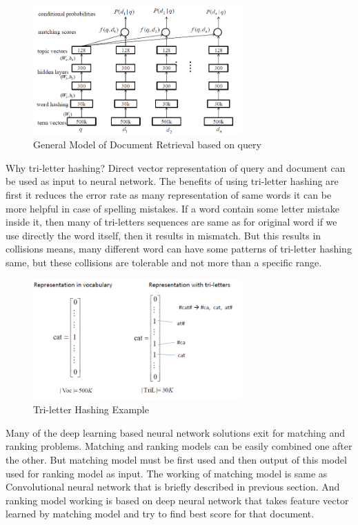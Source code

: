 \documentclass{doublecol-new}
\theoremstyle{TH}{
\newtheorem{lemma}{Lemma}
\newtheorem{theorem}[lemma]{Theorem}
\newtheorem{corrolary}[lemma]{Corrolary}
\newtheorem{conjecture}[lemma]{Conjecture}
\newtheorem{proposition}[lemma]{Proposition}
\newtheorem{claim}[lemma]{Claim}
\newtheorem{stheorem}[lemma]{Wrong Theorem}
\newtheorem{algorithm}{Algorithm}
}
\theoremstyle{THrm}{
\newtheorem{definition}{Definition}[section]
\newtheorem{question}{Question}[section]
\newtheorem{remark}{Remark}
\newtheorem{scheme}{Scheme}
}
\theoremstyle{THhit}{
\newtheorem{case}{Case}[section]
}
\begin{document}
\begin{figure}[h]
	\centerline{\includegraphics[width=8cm,keepaspectratio]{image/search-problem-solution-model.PNG}}
	\label{fig:General Model of Document Retrieval based on query}
	\caption{General Model of Document Retrieval based on query}
\end{figure}


Why tri-letter hashing? Direct vector representation of query and document can be used as input to neural network. The benefits of using tri-letter hashing are first it reduces the error rate as many representation of same words it can be more helpful in case of spelling mistakes. If a word contain some letter mistake inside it, then many of tri-letters sequences are same as for original word if we use directly the word itself, then it results in mismatch. But this results in collisions means, many different word can have some patterns of tri-letter hashing same, but these collisions are tolerable and not more than a specific range. 

\begin{figure}[h]
	\centerline{\includegraphics[width=8cm,keepaspectratio]{image/tri-letter-hashing-example.PNG}}
	\label{fig:Tri-letter Hashing Example}
	\caption{Tri-letter Hashing Example}
\end{figure}

Many of the deep learning based neural network solutions exit for matching and ranking problems. Matching and ranking models can be easily combined one after the other. But matching model must be first used and then output of this model used for ranking model as input. The working of matching model is same as Convolutional neural network that is briefly described in previous section. And ranking model working is based on deep neural network that takes feature vector learned by matching model and try to find best score for that document.  
\end{document}
